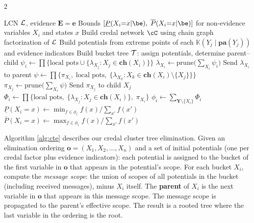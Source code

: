 \documentclass{article}
\newcommand{\kr}[1]{\mathbb{K}\!\left( #1 \right)}
\begin{document}
\begin{algorithm}[t]
\caption{Credal Cluster Tree Elimination (CCTE)}
\label{alg:cte}
\begin{multicols}{2}
\begin{algorithmic}[1]
\Require LCN $\mathcal{L}$, evidence $\mathbf{E} = \mathbf{e}$
\Ensure Bounds $[\underline{P}(X_i{=}x|\be),\; \overline{P}(X_i{=}x|\be)]$ for
        non-evidence variables $X_i$ and states $x$
\State Build credal network $\cC$ using chain graph factorization of $\mathcal{L}$
\State Build potentials from extreme points of each $\kr{Y_j\mid \mathbf{pa}(Y_j)}$ and evidence indicators
\State Build bucket tree $\mathcal{T}$: assign potentials, determine parent--child
\Statex
{}
  \State $\psi_i \gets \prod\{\text{local pots} \cup \{\lambda_{X_j} : X_j \in \mathbf{ch}(X_i)\}\}$
  \State $\lambda_{X_i} \gets \mathrm{prune}\bigl(\sum_{X_i} \psi_i\bigr)$
  \State Send $\lambda_{X_i}$ to parent
\EndFor
{}
    \State $\psi \gets \prod\{\pi_{X_i},\;\text{local pots},\;
           \{\lambda_{X_k} : X_k \in \mathbf{ch}(X_i) \setminus \{X_j\}\}\}$
    \State $\pi_{X_j} \gets \mathrm{prune}\bigl(\sum_{X_i} \psi\bigr)$
    \State Send $\pi_{X_j}$ to child $X_j$
  \EndFor
\EndFor
{}
  \State $\Phi_i \gets \prod\{\text{local pots},\;
         \{\lambda_{X_j} : X_j \in \mathbf{ch}(X_i)\},\; \pi_{X_i}\}$
  \State $\phi_i \gets \sum_{\mathbf{Y} \setminus \{X_i\}} \Phi_i$
  \State $\underline{P}(X_i{=}x) \gets \min_{f \in \phi_i} f(x)/\sum_{x'} f(x')$
  \State $\overline{P}(X_i{=}x) \gets \max_{f \in \phi_i} f(x)/\sum_{x'} f(x')$
\EndFor
\end{algorithmic}
\end{multicols}
\end{algorithm}

Algorithm \ref{alg:cte} describes our credal cluster tree elimination. Given an elimination ordering $\mathbf{o} = (X_1, X_2, \dots, X_n)$ and a set of initial potentials (one per credal factor plus evidence indicators): each potential is assigned to the bucket of the first variable in $\mathbf{o}$ that appears in the potential's scope. For each bucket $X_i$, compute the \emph{message scope}: the union of scopes of all potentials in the bucket (including received messages), minus $X_i$ itself. The \textbf{parent} of $X_i$ is the next variable in $\mathbf{o}$ that appears in this message scope. The message scope is propagated to the parent's effective scope. The result is a rooted tree where the last variable in the ordering is the root.
\end{document}
